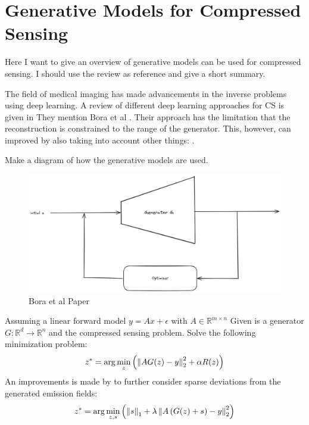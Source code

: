 \section{Generative Models for Compressed Sensing}
Here I want to give an overview of generative models can be used for compressed sensing.
I should use the review as reference and give a short summary.

The field of medical imaging has made advancements in the inverse problems using deep learning.
A review of different deep learning approaches for CS is given in \parencite{ReviewCSUsingAI}
They mention Bora et al \parencite{CSUsingAI}.
Their approach has the limitation that the reconstruction is constrained to the range of the generator.
This, however, can improved by also taking into account other things: \parencite{SparseCSUsingAI}.

Make a diagram of how the generative models are used.
\begin{figure}[h!]
    \centering
    \includegraphics[width=\textwidth]{figures/02_related_work/bora_et_al.png}
    \caption{Bora et al Paper}
\end{figure}

Assuming a linear forward model $y = Ax + \epsilon$ with $A \in \mathbb{R}^{m \times n}$
Given is a generator $G: \mathbb{R}^d \to \mathbb{R}^n$ and the compressed sensing problem.
Solve the following minimization problem:
\begin{equation}
    z^* = \arg\min_{z}{\left( \left\lVert A G(z) - y\right\rVert_2^2 + \alpha R(z) \right)}
\end{equation}
An improvements is made by to further consider sparse deviations from the generated emission fields:
\begin{equation}
    z^* = \arg\min_{z, s}{\left(\left\lVert s\right\rVert_1 + \lambda \left\lVert A \left( G(z) + s \right) - y\right\rVert_2^2 \right)}
\end{equation}

